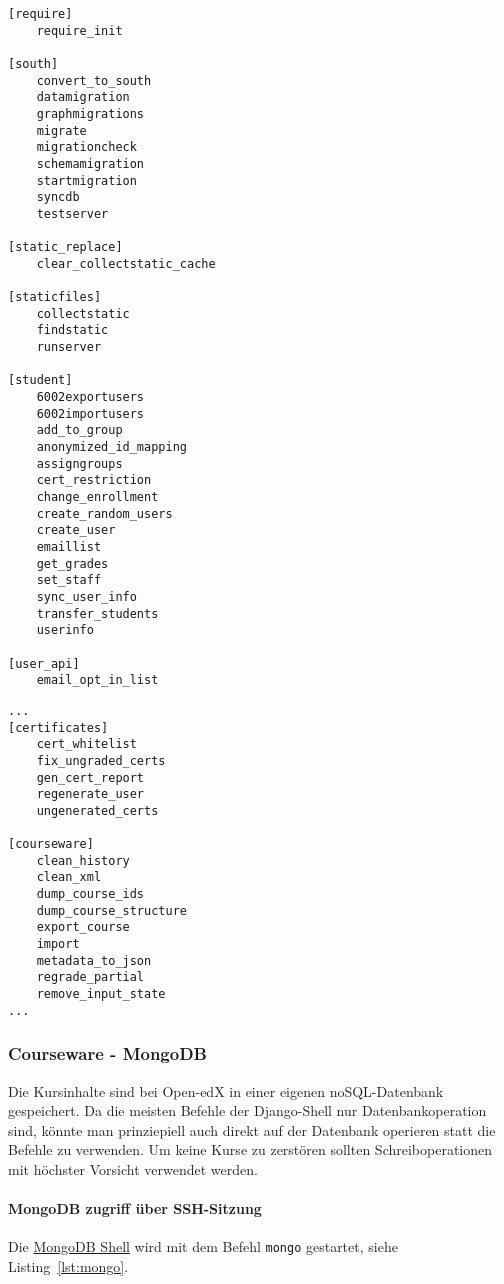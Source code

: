 \documentclass{scrartcl}
\begin{document}
\begin{lstlisting}[caption={Ausgabe von help (auflisten aller Befehle) für das Studio}, label=lst:output_help_cms, breaklines]
[require]
    require_init

[south]
    convert_to_south
    datamigration
    graphmigrations
    migrate
    migrationcheck
    schemamigration
    startmigration
    syncdb
    testserver

[static_replace]
    clear_collectstatic_cache

[staticfiles]
    collectstatic
    findstatic
    runserver

[student]
    6002exportusers
    6002importusers
    add_to_group
    anonymized_id_mapping
    assigngroups
    cert_restriction
    change_enrollment
    create_random_users
    create_user
    emaillist
    get_grades
    set_staff
    sync_user_info
    transfer_students
    userinfo

[user_api]
    email_opt_in_list

\end{lstlisting}

\begin{lstlisting}[caption={Ausgabe von help (auflisten aller Befehle) für das lms}, label=lst:output_help_lms, breaklines]
...
[certificates]
    cert_whitelist
    fix_ungraded_certs
    gen_cert_report
    regenerate_user
    ungenerated_certs

[courseware]
    clean_history
    clean_xml
    dump_course_ids
    dump_course_structure
    export_course
    import
    metadata_to_json
    regrade_partial
    remove_input_state
...
\end{lstlisting}

\subsubsection{Courseware - MongoDB}
Die Kursinhalte sind bei Open-edX in einer eigenen noSQL-Datenbank gespeichert. Da die meisten Befehle der Django-Shell nur Datenbankoperation sind, könnte man prinziepiell auch direkt auf der Datenbank operieren statt die Befehle zu verwenden. Um keine Kurse zu zerstören sollten Schreiboperationen mit höchster Vorsicht verwendet werden.

\paragraph{MongoDB zugriff über SSH-Sitzung}

Die \href{https://docs.mongodb.com/getting-started/shell/client/}{MongoDB Shell} wird mit dem Befehl \lstinline|mongo| gestartet, siehe Listing~\ref{lst:mongo}.
\end{document}
